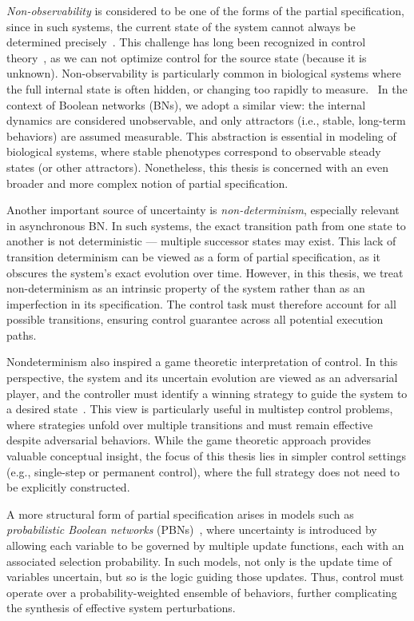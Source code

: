 \emph{Non-observability} is considered to be one of the forms of the partial specification, since in such systems, the current state of the system cannot always be determined precisely~\cite{Kalman1960}. This challenge has long been recognized in control theory~\cite{Flokentin1962, Sorenson1968}, as we can not optimize control for the source state (because it is unknown). Non-observability is particularly common in biological systems where the full internal state is often hidden, or changing too rapidly to measure.~\cite{Liu2013,Villaverde2019} In the context of Boolean networks (BNs), we adopt a similar view: the internal dynamics are considered unobservable, and only attractors (i.e., stable, long-term behaviors) are assumed measurable. This abstraction is essential in modeling of biological systems, where stable phenotypes correspond to observable steady states (or other attractors). Nonetheless, this thesis is concerned with an even broader and more complex notion of partial specification.


Another important source of uncertainty is \emph{non-determinism}, especially relevant in asynchronous BN. In such systems, the exact transition path from one state to another is not deterministic — multiple successor states may exist. This lack of transition determinism can be viewed as a form of partial specification, as it obscures the system’s exact evolution over time. However, in this thesis, we treat non-determinism as an intrinsic property of the system rather than as an imperfection in its specification. The control task must therefore account for all possible transitions, ensuring control guarantee across all potential execution paths.


Nondeterminism also inspired a game theoretic interpretation of control. In this perspective, the system and its uncertain evolution are viewed as an adversarial player, and the controller must identify a winning strategy to guide the system to a desired state~\cite{Mandon2019PHD}. This view is particularly useful in multistep control problems, where strategies unfold over multiple transitions and must remain effective despite adversarial behaviors. While the game theoretic approach provides valuable conceptual insight, the focus of this thesis lies in simpler control settings (e.g., single-step or permanent control), where the full strategy does not need to be explicitly constructed.


A more structural form of partial specification arises in models such as \emph{probabilistic Boolean networks} (PBNs)~\cite{Shmulevich2002}, where uncertainty is introduced by allowing each variable to be governed by multiple update functions, each with an associated selection probability. In such models, not only is the update time of variables uncertain, but so is the logic guiding those updates. Thus, control must operate over a probability-weighted ensemble of behaviors, further complicating the synthesis of effective system perturbations.

